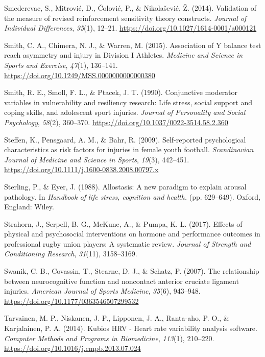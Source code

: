 \documentclass[man,floatsintext]{apa6}
\begin{document}
\leavevmode\hypertarget{ref-Smederevac2014}{}%
Smederevac, S., Mitrović, D., Čolović, P., \& Nikolašević, Ž. (2014). Validation of the measure of revised reinforcement sensitivity theory constructs. \emph{Journal of Individual Differences}, \emph{35}(1), 12--21. \url{https://doi.org/10.1027/1614-0001/a000121}

\leavevmode\hypertarget{ref-Smith2015}{}%
Smith, C. A., Chimera, N. J., \& Warren, M. (2015). Association of Y balance test reach asymmetry and injury in Division I Athletes. \emph{Medicine and Science in Sports and Exercise}, \emph{47}(1), 136--141. \url{https://doi.org/10.1249/MSS.0000000000000380}

\leavevmode\hypertarget{ref-Smith1990}{}%
Smith, R. E., Smoll, F. L., \& Ptacek, J. T. (1990). Conjunctive moderator variables in vulnerability and resiliency research: Life stress, social support and coping skills, and adolescent sport injuries. \emph{Journal of Personality and Social Psychology}, \emph{58}(2), 360--370. \url{https://doi.org/10.1037/0022-3514.58.2.360}

\leavevmode\hypertarget{ref-Steffen2009}{}%
Steffen, K., Pensgaard, A. M., \& Bahr, R. (2009). Self-reported psychological characteristics as risk factors for injuries in female youth football. \emph{Scandinavian Journal of Medicine and Science in Sports}, \emph{19}(3), 442--451. \url{https://doi.org/10.1111/j.1600-0838.2008.00797.x}

\leavevmode\hypertarget{ref-Sterling1988}{}%
Sterling, P., \& Eyer, J. (1988). Allostasis: A new paradigm to explain arousal pathology. In \emph{Handbook of life stress, cognition and health.} (pp. 629--649). Oxford, England: Wiley.

\leavevmode\hypertarget{ref-Strahorn2017}{}%
Strahorn, J., Serpell, B. G., McKune, A., \& Pumpa, K. L. (2017). Effects of physical and psychosocial interventions on hormone and performance outcomes in professional rugby union players: A systematic review. \emph{Journal of Strength and Conditioning Research}, \emph{31}(11), 3158--3169.

\leavevmode\hypertarget{ref-Swanik2007}{}%
Swanik, C. B., Covassin, T., Stearne, D. J., \& Schatz, P. (2007). The relationship between neurocognitive function and noncontact anterior cruciate ligament injuries. \emph{American Journal of Sports Medicine}, \emph{35}(6), 943--948. \url{https://doi.org/10.1177/0363546507299532}

\leavevmode\hypertarget{ref-Tarvainen2014}{}%
Tarvainen, M. P., Niskanen, J. P., Lipponen, J. A., Ranta-aho, P. O., \& Karjalainen, P. A. (2014). Kubios HRV - Heart rate variability analysis software. \emph{Computer Methods and Programs in Biomedicine}, \emph{113}(1), 210--220. \url{https://doi.org/10.1016/j.cmpb.2013.07.024}
\end{document}
